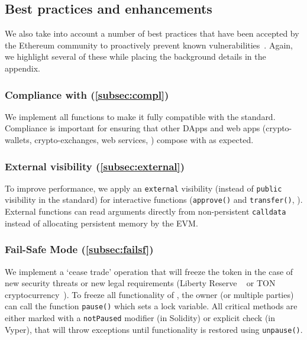 
\subsection{Best practices and enhancements}
We also take into account a number of best practices that have been accepted by the Ethereum community to proactively prevent known vulnerabilities~\cite{TokenBP}. Again, we highlight several of these while placing the background details in the appendix.

\subsubsection{Compliance with \erc (\ref{subsec:compl})}
We implement all \erc functions to make it fully compatible with the standard. Compliance is important for ensuring that other DApps and web apps (\ie crypto-wallets, crypto-exchanges, web services, \etc) compose with \sys as expected. 

\subsubsection{External visibility (\ref{subsec:external})}
To improve performance, we apply an \texttt{external} visibility (instead of \texttt{public} visibility in the standard) for interactive functions (\eg \texttt{approve()} and \texttt{transfer()}, \etc).  External functions can read arguments directly from non-persistent \texttt{calldata} instead of allocating persistent memory by the EVM. 

\subsubsection{Fail-Safe Mode (\ref{subsec:failsf})}
We implement a `cease trade' operation that will freeze the token in the case of new security threats or new legal requirements (\eg Liberty Reserve ~\cite{LibertyReserve} or TON cryptocurrency~\cite{TON}). To freeze all functionality of \sys, the owner (or multiple parties) can call the function \texttt{pause()} which sets a lock variable. All critical methods are either marked with a \texttt{notPaused} modifier (in Solidity) or explicit check (in Vyper), that will throw exceptions until functionality is restored using \texttt{unpause()}. 

